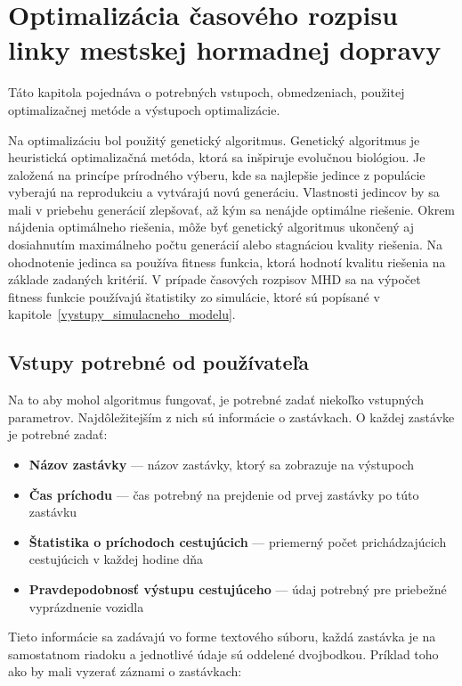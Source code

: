 \chapter{Optimalizácia časového rozpisu linky mestskej hormadnej dopravy}\label{optimalizacia}

Táto kapitola pojednáva o potrebných vstupoch, obmedzeniach, použitej optimalizačnej metóde a výstupoch optimalizácie.

Na optimalizáciu bol použitý genetický algoritmus.
Genetický algoritmus je heuristická optimalizačná metóda, ktorá sa inšpiruje evolučnou biológiou.
Je založená na princípe prírodného výberu, kde sa najlepšie jedince z populácie vyberajú na reprodukciu a vytvárajú novú generáciu.
Vlastnosti jedincov by sa mali v priebehu generácií zlepšovať, až kým sa nenájde optimálne riešenie.
Okrem nájdenia optimálneho riešenia, môže byť genetický algoritmus ukončený aj dosiahnutím maximálneho počtu generácií alebo stagnáciou kvality riešenia.
Na ohodnotenie jedinca sa používa fitness funkcia, ktorá hodnotí kvalitu riešenia na základe zadaných kritérií.
V prípade časových rozpisov MHD sa na výpočet fitness funkcie používajú štatistiky zo simulácie, ktoré sú popísané v kapitole~\ref{vystupy_simulacneho_modelu}.

\section{Vstupy potrebné od používateľa}\label{vstupy_pouzivatela}
Na to aby mohol algoritmus fungovať, je potrebné zadať niekoľko vstupných parametrov.
Najdôležitejším z nich sú informácie o zastávkach. O každej zastávke je potrebné zadať:
\begin{itemize}
  \item \textbf{Názov zastávky} --- názov zastávky, ktorý sa zobrazuje na výstupoch
  \item \textbf{Čas príchodu} --- čas potrebný na prejdenie od prvej zastávky po túto zastávku
  \item \textbf{Štatistika o príchodoch cestujúcich} --- priemerný počet prichádzajúcich cestujúcich v každej hodine dňa
  \item \textbf{Pravdepodobnosť výstupu cestujúceho} --- údaj potrebný pre priebežné vyprázdnenie vozidla
\end{itemize}
Tieto informácie sa zadávajú vo forme textového súboru, každá zastávka je na samostatnom riadoku a jednotlivé údaje sú oddelené dvojbodkou.
Príklad toho ako by mali vyzerať záznami o zastávkach:

